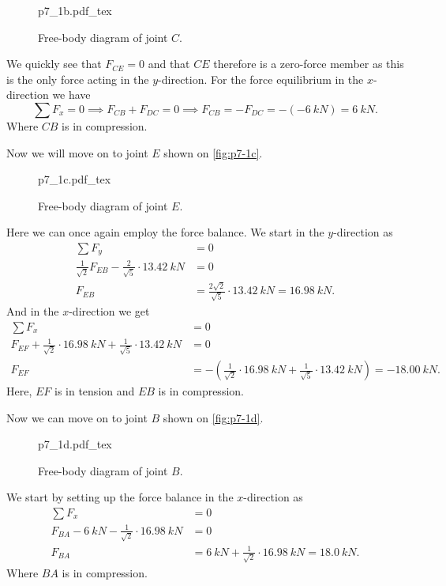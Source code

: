 \documentclass[a4paper]{article}
\newcommand{\incfig}[2][1]{%
  \def\svgwidth{#1\columnwidth}
  {#2.pdf_tex}
}
\theoremstyle{definition}
\begin{document}
\begin{figure}[ht]
  \centering
  \incfig[0.3]{p7_1b}
  \caption{Free-body diagram of joint $C$.}
  \label{fig:p7-1b}
\end{figure}

We quickly see that $F_{CE} = 0$ and that $CE$ therefore is a zero-force member as this is the only force acting in the $y$-direction. For the force equilibrium in the $x$-direction we have
\[ 
\sum F_x = 0 \implies F_{CB} + F_{DC} = 0 \implies F_{CB} = - F_{DC} = - (\qty{-6}{kN}) = \qty{6}{kN} 
.\]
Where $CB$ is in compression. 

Now we will move on to joint $E$ shown on \autoref{fig:p7-1c}. 
\begin{figure}[ht]
  \centering
  \incfig[0.4]{p7_1c}
  \caption{Free-body diagram of joint $E$.}
  \label{fig:p7-1c}
\end{figure}

Here we can once again employ the force balance. We start in the $y$-direction as
\begin{align*}
  \sum F_y &= 0 \\
  \frac{1}{\sqrt{2}} F_{EB} - \frac{2}{\sqrt{5}} \cdot \qty{13,42}{kN} &= 0 \\
  F_{EB} &= \frac{2 \sqrt{2}}{\sqrt{5}} \cdot \qty{13,42}{kN} = \qty{16,98}{kN}
.\end{align*}
And in the $x$-direction we get
\begin{align*}
  \sum F_x &= 0 \\
  F_{EF} + \frac{1}{\sqrt{2}} \cdot \qty{16,98}{kN} + \frac{1}{\sqrt{5}} \cdot \qty{13,42}{kN} &= 0 \\
  F_{EF} &= - \left( \frac{1}{\sqrt{2}} \cdot \qty{16,98}{kN} + \frac{1}{\sqrt{5}} \cdot \qty{13,42}{kN}  \right) = \qty{-18,00}{kN} 
.\end{align*}
Here, $EF$ is in tension and $EB$ is in compression. 

Now we can move on to joint $B$ shown on \autoref{fig:p7-1d}. 

\begin{figure}[ht]
  \centering
  \incfig[0.55]{p7_1d}
  \caption{Free-body diagram of joint $B$.}
  \label{fig:p7-1d}
\end{figure}

We start by setting up the force balance in the $x$-direction as
\begin{align*}
  \sum F_x &= 0 \\
  F_{BA} - \qty{6}{kN} - \frac{1}{\sqrt{2}} \cdot \qty{16,98}{kN} &= 0 \\
  F_{BA} &= \qty{6}{kN} +  \frac{1}{\sqrt{2}} \cdot \qty{16,98}{kN} = \qty{18,0}{kN} 
.\end{align*}
Where $BA$ is in compression.
\end{document}

